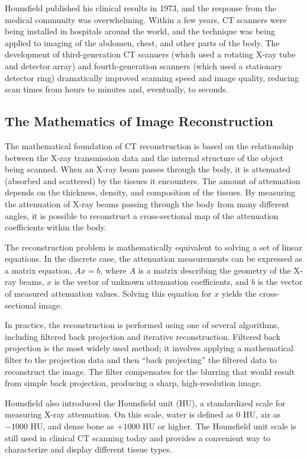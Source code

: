 Hounsfield published his clinical results in 1973, and the response from the medical community was overwhelming. Within a few years, CT scanners were being installed in hospitals around the world, and the technique was being applied to imaging of the abdomen, chest, and other parts of the body. The development of third-generation CT scanners (which used a rotating X-ray tube and detector array) and fourth-generation scanners (which used a stationary detector ring) dramatically improved scanning speed and image quality, reducing scan times from hours to minutes and, eventually, to seconds.

\subsection{The Mathematics of Image Reconstruction}

The mathematical foundation of CT reconstruction is based on the relationship between the X-ray transmission data and the internal structure of the object being scanned. When an X-ray beam passes through the body, it is attenuated (absorbed and scattered) by the tissues it encounters. The amount of attenuation depends on the thickness, density, and composition of the tissues. By measuring the attenuation of X-ray beams passing through the body from many different angles, it is possible to reconstruct a cross-sectional map of the attenuation coefficients within the body.

The reconstruction problem is mathematically equivalent to solving a set of linear equations. In the discrete case, the attenuation measurements can be expressed as a matrix equation, $Ax = b$, where $A$ is a matrix describing the geometry of the X-ray beams, $x$ is the vector of unknown attenuation coefficients, and $b$ is the vector of measured attenuation values. Solving this equation for $x$ yields the cross-sectional image.

In practice, the reconstruction is performed using one of several algorithms, including filtered back projection and iterative reconstruction. Filtered back projection is the most widely used method; it involves applying a mathematical filter to the projection data and then ``back projecting'' the filtered data to reconstruct the image. The filter compensates for the blurring that would result from simple back projection, producing a sharp, high-resolution image.

Hounsfield also introduced the Hounsfield unit (HU), a standardized scale for measuring X-ray attenuation. On this scale, water is defined as 0 HU, air as $-1000$ HU, and dense bone as $+1000$ HU or higher. The Hounsfield unit scale is still used in clinical CT scanning today and provides a convenient way to characterize and display different tissue types.

